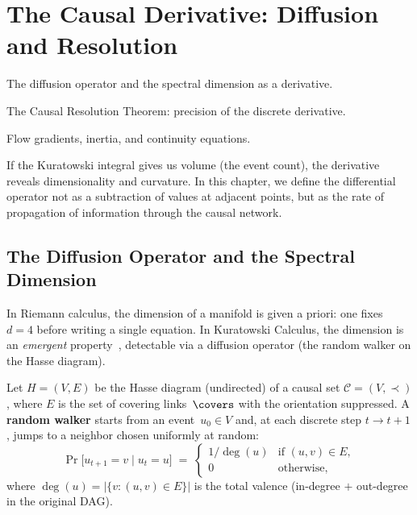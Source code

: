 \chapter{The Causal Derivative: Diffusion and Resolution}

\begin{introduction}
  \item The diffusion operator and the spectral dimension as a derivative.
  \item The Causal Resolution Theorem: precision of the discrete derivative.
  \item Flow gradients, inertia, and continuity equations.
\end{introduction}

If the Kuratowski integral gives us volume (the event count),
the derivative reveals dimensionality and curvature. In this
chapter, we define the differential operator not as a subtraction of
values at adjacent points, but as the rate of propagation of
information through the causal network.

\section{The Diffusion Operator and the Spectral Dimension}

In Riemann calculus, the dimension of a manifold is given
a priori: one fixes $d = 4$ before writing a single
equation. In Kuratowski Calculus, the dimension is an
\emph{emergent}
property~\cite{carlip2017,ambjorn2005,eichhorn2014},
detectable via a diffusion operator (the random walker
on the Hasse diagram).

\begin{definition}
\label{def:random-walker}
Let $H = (V, E)$ be the Hasse diagram (undirected) of a causal
set $\mathcal{C} = (V, \prec)$, where $E$ is the set of
covering links~$\covers$ with the orientation suppressed.
A \textbf{random walker} starts from an event~$u_0 \in V$ and, at
each discrete step $t \to t+1$, jumps to a neighbor chosen
uniformly at random:
\[
  \Pr\bigl[u_{t+1} = v \;\big|\; u_t = u\bigr]
  \;=\;
  \begin{cases}
    1/\deg(u) & \text{if } (u,v) \in E,\\[2pt]
    0 & \text{otherwise,}
  \end{cases}
\]
where $\deg(u) = |\{v : (u,v) \in E\}|$ is the total valence
(in-degree $+$ out-degree in the original DAG).
\end{definition}

